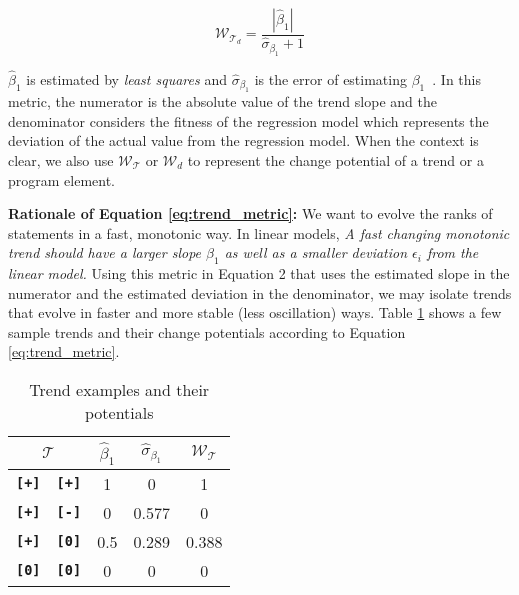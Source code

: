 \begin{equation}
\label{eq:trend_metric}
	\mathcal{W}_{\mathcal{T}_d} =  \frac{| \hat{\beta}_{1} |}{\hat{\sigma}_{\beta_{1}}+1}
\end{equation}


\noindent
$\hat{\beta}_{1}$ is estimated by {\em least squares} and $\hat{\sigma}_{\beta_{1}}$ is the error of estimating $\beta_{1}$~\citep{GrIy94}. In this metric, the numerator is the absolute value of the trend slope and the denominator considers the fitness of the regression model which represents the deviation of the actual value from the regression model.
When the context is clear, we also use $\mathcal{W}_\mathcal{T}$ or $\mathcal{W}_d$ to represent the change potential of a trend or a program element.

\noindent\textbf{Rationale of Equation \ref{eq:trend_metric}:} We want to evolve the ranks of statements in a fast, monotonic way. In linear models, \textit{A fast changing monotonic trend should have a larger slope $\beta_1$ as well as a smaller deviation $\epsilon_i$ from the linear model.}
Using this metric in Equation 2 that uses the estimated slope in the numerator and the estimated deviation in the denominator, we may isolate trends that evolve in faster and more stable (less oscillation) ways. Table \ref{tab:trend_exp} shows a few sample trends and their change potentials according to Equation \ref{eq:trend_metric}.

\begin{table}[!htbp]
	\centering
	\caption{Trend examples and their potentials}
		\renewcommand{\arraystretch}{1.5}
        \begin{tabular}{|cc|ccc|}
			\hline
			 \multicolumn{ 2}{|c|}{$\mathcal{T}$} &     $\hat{\beta}_{1}$ &      $\hat{\sigma}_{\beta_{1}}$ &  $\mathcal{W}_\mathcal{T}$ \\
			\hline\hline
			 {\bf \texttt{[+]}} &  {\bf \texttt{[+]}} &          1 &          0 &          1 \\
			\hline
			 {\bf \texttt{[+]}} &  {\bf \texttt{[-]}} &          0 &      0.577 &          0 \\
			\hline
			 {\bf \texttt{[+]}} &  {\bf \texttt{[0]}} &        0.5 &      0.289 &      0.388 \\
			\hline
			 {\bf \texttt{[0]}} &  {\bf \texttt{[0]}} &          0 &          0 &          0 \\
			\hline
		\end{tabular}
	\label{tab:trend_exp}
\end{table}

